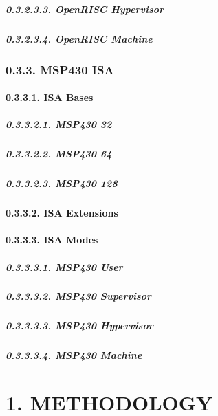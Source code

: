 \documentclass[
]{article}
\begin{document}
\hypertarget{openrisc-hypervisor-1}{%
\subparagraph{0.3.2.3.3. OpenRISC
Hypervisor}\label{openrisc-hypervisor-1}}

\hypertarget{openrisc-machine-1}{%
\subparagraph{0.3.2.3.4. OpenRISC Machine}\label{openrisc-machine-1}}

\hypertarget{msp430-isa-1}{%
\subsubsection{0.3.3. MSP430 ISA}\label{msp430-isa-1}}

\hypertarget{isa-bases-5}{%
\paragraph{0.3.3.1. ISA Bases}\label{isa-bases-5}}

\hypertarget{msp430-32-1}{%
\subparagraph{0.3.3.2.1. MSP430 32}\label{msp430-32-1}}

\hypertarget{msp430-64-1}{%
\subparagraph{0.3.3.2.2. MSP430 64}\label{msp430-64-1}}

\hypertarget{msp430-128-1}{%
\subparagraph{0.3.3.2.3. MSP430 128}\label{msp430-128-1}}

\hypertarget{isa-extensions-5}{%
\paragraph{0.3.3.2. ISA Extensions}\label{isa-extensions-5}}

\hypertarget{isa-modes-5}{%
\paragraph{0.3.3.3. ISA Modes}\label{isa-modes-5}}

\hypertarget{msp430-user-1}{%
\subparagraph{0.3.3.3.1. MSP430 User}\label{msp430-user-1}}

\hypertarget{msp430-supervisor-1}{%
\subparagraph{0.3.3.3.2. MSP430 Supervisor}\label{msp430-supervisor-1}}

\hypertarget{msp430-hypervisor-1}{%
\subparagraph{0.3.3.3.3. MSP430 Hypervisor}\label{msp430-hypervisor-1}}

\hypertarget{msp430-machine-1}{%
\subparagraph{0.3.3.3.4. MSP430 Machine}\label{msp430-machine-1}}

\hypertarget{methodology-1}{%
\section{1. METHODOLOGY}\label{methodology-1}}
\end{document}
